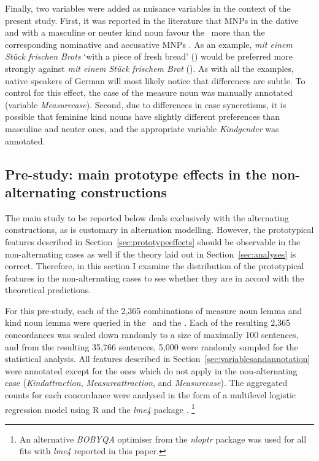 Finally, two variables were added as nuisance variables in the context of the present study.
First, it was reported in the literature that MNPs in the dative and with a masculine or neuter kind noun favour the \PGCa\ more than the corresponding nominative and accusative MNPs \citep{Hentschel1993,Zimmer2015}.
As an example, \textit{mit einem Stück frischen Brots} `with a piece of fresh bread' (\PGCa) would be preferred more strongly against \textit{mit einem Stück frischem Brot} (\NACa).
As with all the examples, native speakers of German will most likely notice that differences are subtle.
To control for this effect, the case of the measure noun was manually annotated (variable \textit{Measurecase}).
Second, due to differences in case syncretisms, it is possible that feminine kind nouns have slightly different preferences than masculine and neuter ones, and the appropriate variable \textit{Kindgender} was annotated.

\subsection{Pre-study: main prototype effects in the non-alternating constructions}
\label{sec:prestudy}

The main study to be reported below deals exclusively with the alternating constructions, as is customary in alternation modelling.
However, the prototypical features described in Section~\ref{sec:prototypeeffects} should be observable in the non-alternating cases as well if the theory laid out in Section~\ref{sec:analyses} is correct.
Therefore, in this section I examine the distribution of the prototypical features in the non-alternating cases to see whether they are in accord with the theoretical predictions.

For this pre-study, each of the 2,365 combinations of measure noun lemma and kind noun lemma were queried in the \NACb\ and the \PGCd.
Each of the resulting 2,365 concordances was scaled down randomly to a size of maximally 100 sentences, and from the resulting 35,766 sentences, 5,000 were randomly sampled for the statistical analysis.
All features described in Section~\ref{sec:variablesandannotation} were annotated except for the ones which do not apply in the non-alternating case (\textit{Kindattraction}, \textit{Measureattraction}, and \textit{Measurecase}).
The aggregated counts for each concordance were analysed in the form of a multilevel logistic regression model using R \citep{R} and the \textit{lme4} package \citep{Bates2010,BatesEa2015}.%
\footnote{An alternative \textit{BOBYQA} optimiser from the \textit{nloptr} package \citep{Johnson2017} was used for all fits with \textit{lme4} reported in this paper.}

